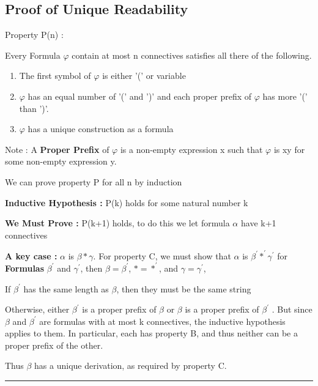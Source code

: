 \documentclass{article}
\newenvironment{proof}{{\bf Proof:}}{\hfill\rule{2mm}{2mm}}
\begin{document}
\subsection{Proof of Unique Readability}
\begin{proof}
Property P(n) : 

Every Formula \(\varphi\) contain at most n connectives satisfies all there of the following. 

\begin{enumerate}[A:]
\item The first symbol of \(\varphi\) is either '(' or variable 
\item \(\varphi\) has an equal number of '(' and ')' and each proper prefix of \(\varphi\) has more '(' than  ')'.
\item \(\varphi\) has a unique construction as a formula 
\end{enumerate}

Note : A \textbf{Proper Prefix} of \(\varphi\) is a non-empty expression x such that \(\varphi\) is xy for some non-empty expression y.

\begin{center}
We can prove property P for all n by induction 
\end{center}

\textbf{Inductive Hypothesis : } P(k) holds for some natural number k 

\textbf{We Must Prove :} P(k+1) holds, to do this we let formula \(\alpha\) have k+1 connectives 

\textbf{A key case : } \(\alpha\) is \(\beta * \gamma\). For property C, we must show that \(\alpha\) is  \(\beta^{\prime} *^{\prime} \gamma^{\prime} \) for \textbf{Formulas} \(\beta^{\prime}\) and \(\gamma^{\prime}\), then \(\beta = \beta^{\prime}\), \(* = *^{\prime}\), and \(\gamma = \gamma^{\prime}\), 

If \(\beta^{\prime}\) has the same length as \(\beta\), then they must be the same string

Otherwise, either \(\beta^{\prime}\) is a proper prefix of \(\beta\)  or \(\beta\) is a proper prefix of \(\beta^{\prime}\) . But since \(\beta\) and \(\beta^{\prime}\)  are formulas with at most k
connectives, the inductive hypothesis applies to them.
In particular, each has property B, and thus neither can be a
proper prefix of the other.


Thus \(\beta\) has a unique derivation, as required by property C.

\end{proof}
\end{document}
